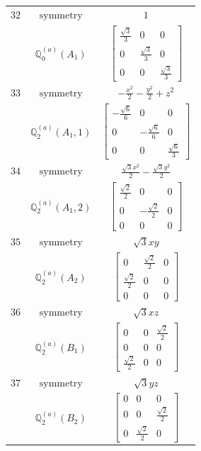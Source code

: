 \documentclass[fleqn,8pt,landscape]{jsarticle}
\begin{document}
\begin{longtable}{ccc}
$ 32 $ & $ \text{symmetry} $ & $ 1 $ \\
$  $ & $ \mathbb{Q}_{0}^{(a)}(A_{1}) $ & $ \begin{bmatrix} \frac{\sqrt{3}}{3} & 0 & 0 \\ 0 & \frac{\sqrt{3}}{3} & 0 \\ 0 & 0 & \frac{\sqrt{3}}{3} \end{bmatrix} $ \\ \hline
$ 33 $ & $ \text{symmetry} $ & $ - \frac{x^{2}}{2} - \frac{y^{2}}{2} + z^{2} $ \\
$  $ & $ \mathbb{Q}_{2}^{(a)}(A_{1},1) $ & $ \begin{bmatrix} - \frac{\sqrt{6}}{6} & 0 & 0 \\ 0 & - \frac{\sqrt{6}}{6} & 0 \\ 0 & 0 & \frac{\sqrt{6}}{3} \end{bmatrix} $ \\ \hline
$ 34 $ & $ \text{symmetry} $ & $ \frac{\sqrt{3} x^{2}}{2} - \frac{\sqrt{3} y^{2}}{2} $ \\
$  $ & $ \mathbb{Q}_{2}^{(a)}(A_{1},2) $ & $ \begin{bmatrix} \frac{\sqrt{2}}{2} & 0 & 0 \\ 0 & - \frac{\sqrt{2}}{2} & 0 \\ 0 & 0 & 0 \end{bmatrix} $ \\ \hline
$ 35 $ & $ \text{symmetry} $ & $ \sqrt{3} x y $ \\
$  $ & $ \mathbb{Q}_{2}^{(a)}(A_{2}) $ & $ \begin{bmatrix} 0 & \frac{\sqrt{2}}{2} & 0 \\ \frac{\sqrt{2}}{2} & 0 & 0 \\ 0 & 0 & 0 \end{bmatrix} $ \\ \hline
$ 36 $ & $ \text{symmetry} $ & $ \sqrt{3} x z $ \\
$  $ & $ \mathbb{Q}_{2}^{(a)}(B_{1}) $ & $ \begin{bmatrix} 0 & 0 & \frac{\sqrt{2}}{2} \\ 0 & 0 & 0 \\ \frac{\sqrt{2}}{2} & 0 & 0 \end{bmatrix} $ \\ \hline
$ 37 $ & $ \text{symmetry} $ & $ \sqrt{3} y z $ \\
$  $ & $ \mathbb{Q}_{2}^{(a)}(B_{2}) $ & $ \begin{bmatrix} 0 & 0 & 0 \\ 0 & 0 & \frac{\sqrt{2}}{2} \\ 0 & \frac{\sqrt{2}}{2} & 0 \end{bmatrix} $ \\ \hline

\end{longtable}
\end{document}
